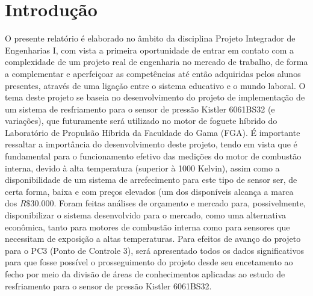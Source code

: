 \chapter{Introdução}
O presente relatório é elaborado no âmbito da disciplina Projeto Integrador de Engenharias I, com vista a primeira oportunidade de entrar em contato com a complexidade de um projeto real de engenharia no mercado de trabalho, de forma a complementar e aperfeiçoar as competências até então adquiridas pelos alunos presentes, através de uma ligação entre o sistema educativo e o mundo laboral. O tema deste projeto se baseia no desenvolvimento do projeto de implementação de um sistema de resfriamento para o sensor de pressão Kistler 6061BS32 (e variações), que futuramente será utilizado no motor de foguete híbrido do Laboratório de Propulsão Híbrida da Faculdade do Gama (FGA). É importante ressaltar a importância do desenvolvimento deste projeto, tendo em vista que é fundamental para o funcionamento efetivo das medições do motor de combustão interna, devido à alta temperatura (superior à 1000 Kelvin), assim como a disponibilidade de um sistema de arrefecimento para este tipo de sensor ser, de certa forma, baixa e com preços elevados (um dos disponíveis alcança a marca dos $R\$30.000$. Foram feitas análises de orçamento e mercado para, possivelmente, disponibilizar o sistema desenvolvido para o mercado, como uma alternativa econômica, tanto para motores de combustão interna como para sensores que necessitam de exposição a altas temperaturas. Para efeitos de avanço do projeto para o PC3 (Ponto de Controle 3), será apresentado todos os dados significativos para que fosse possível o prosseguimento do projeto desde seu encetamento ao fecho por meio da divisão de áreas de conhecimentos aplicadas ao estudo de resfriamento para o sensor de pressão Kistler 6061BS32.
